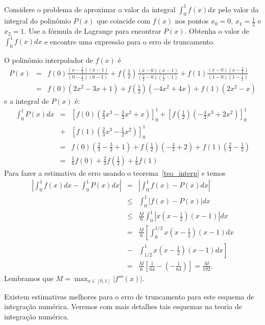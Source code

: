 \begin{ex}\label{exemp_simpson}
Considere o problema de aproximar o valor da integral $\int_0^1 f(x)dx$ pelo valor da integral do polinômio $P(x)$ que coincide com $f(x)$ nos pontos $x_0=0$, $x_1=\frac{1}{2}$ e $x_2=1$. Use a fórmula de Lagrange para encontrar $P(x)$. Obtenha o valor de $\int_0^1f(x)dx$ e encontre uma expressão para o erro de truncamento.
\end{ex}
O polinômio interpolador de $f(x)$ é
\begin{eqnarray*}
P(x)&=&f(0)\frac{(x-\frac{1}{2})(x-1)}{(0-\frac{1}{2})(0-1)}+f\left(\frac{1}{2}\right)\frac{(x-0)(x-1)}{(\frac{1}{2}-0)(\frac{1}{2}-1)}+f(1)\frac{(x-0)(x-\frac{1}{2})}{(1-0)(1-\frac{1}{2})}\\
&=&   f(0)(2x^2-3x+1)+f\left(\frac{1}{2}\right)(-4x^2+4x)+f(1)(2x^2-x)
\end{eqnarray*}
e a integral de $P(x)$ é:
\begin{eqnarray*}
\int_0^1 P(x)dx &=& \left[f(0)\left(\frac{2}{3}x^3 - \frac{3}{2}x^2+x\right)\right]_0^1 + \left[f\left(\frac{1}{2}\right)\left(-\frac{4}{3}x^3+2x^2\right)\right]_0^1 \\
&+& \left[f(1)\left(\frac{2}{3}x^3-\frac{1}{2}x^2\right)\right]_0^1\\
&=& f(0)\left(\frac{2}{3}-\frac{3}{2}+1\right)+f\left(\frac{1}{2}\right)\left(-\frac{4}{3}+2\right)+f(1)\left(\frac{2}{3}-\frac{1}{2}\right)\\
&=& \frac{1}{6}f(0)+\frac{2}{3}f\left(\frac{1}{2}\right)+\frac{1}{6}f(1)
\end{eqnarray*}
Para fazer a estimativa de erro usando o teorema~\ref{teo_interp} e temos
\begin{eqnarray*}
\left|\int_0^1f(x)dx-\int_0^1 P(x)dx\right|&=&\left|\int_0^1f(x)- P(x)dx\right|\\
&\leq&\int_0^1|f(x)- P(x)|dx\\
&\leq& \frac{M}{6}  \int_0^1\left|x\left(x-\frac{1}{2}\right)(x-1)\right|dx\\
&=& \frac{M}{6}  \left[\int_0^{1/2}x\left(x-\frac{1}{2}\right)(x-1)dx\right.\\
&-&\left.\int_{1/2}^1x\left(x-\frac{1}{2}\right)(x-1)dx\right]\\
&=& \frac{M}{6}  \left[\frac{1}{64}-\left(-\frac{1}{64}\right)\right]=\frac{M}{192}.
\end{eqnarray*}
Lembramos que $M=\max_{x\in[0,1]}|f'''(x)|$.

\begin{obs}Existem estimativas melhores para o erro de truncamento para este esquema de integração numérica. Veremos com mais detalhes tais esquemas na teoria de integração numérica.
\end{obs}

